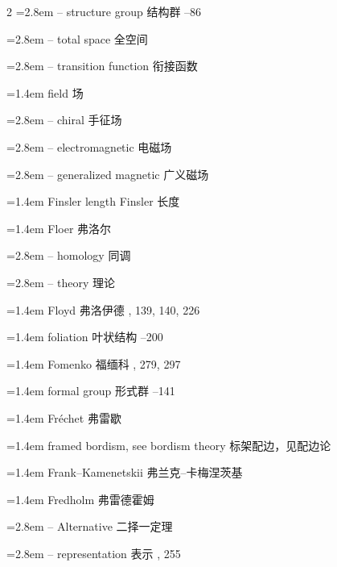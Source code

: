 \begin{multicols}{2}
\noindent\hangindent=2.8em -- structure group \quad 结构群 --86\par
\noindent\hangindent=2.8em -- total space \quad 全空间 \par
\noindent\hangindent=2.8em -- transition function \quad 衔接函数 \par
\noindent\hangindent=1.4em field \quad 场 \quad\par
\noindent\hangindent=2.8em -- chiral \quad 手征场 \par
\noindent\hangindent=2.8em -- electromagnetic \quad 电磁场 \par
\noindent\hangindent=2.8em -- generalized magnetic \quad 广义磁场 \par
\noindent\hangindent=1.4em Finsler length \quad Finsler 长度 \par
\noindent\hangindent=1.4em Floer \quad 弗洛尔 \quad\par
\noindent\hangindent=2.8em -- homology \quad 同调 \par
\noindent\hangindent=2.8em -- theory \quad 理论 \par
\noindent\hangindent=1.4em Floyd \quad 弗洛伊德 , 139, 140, 226\par
\noindent\hangindent=1.4em foliation \quad 叶状结构 --200\par
\noindent\hangindent=1.4em Fomenko \quad 福缅科 , 279, 297\par
\noindent\hangindent=1.4em formal group \quad 形式群 --141\par
\noindent\hangindent=1.4em Fr\'echet \quad 弗雷歇 \par
\noindent\hangindent=1.4em framed bordism, see bordism theory \quad 标架配边，见配边论 \quad\par
\noindent\hangindent=1.4em Frank--Kamenetskii \quad 弗兰克--卡梅涅茨基 \par
\noindent\hangindent=1.4em Fredholm \quad 弗雷德霍姆 \quad\par
\noindent\hangindent=2.8em -- Alternative \quad 二择一定理 \par
\noindent\hangindent=2.8em -- representation \quad 表示 , 255\par

\end{multicols}
